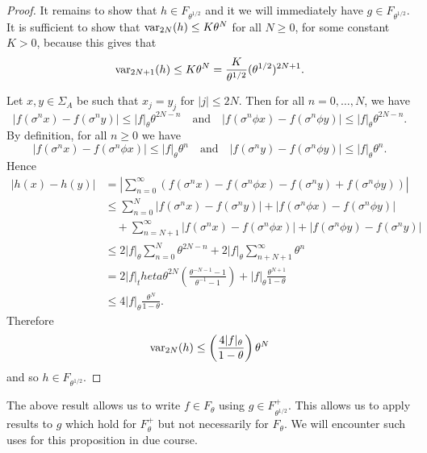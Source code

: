 \begin{proposition}
\begin{proof}
		It remains to show that $h \in F_{\theta^{1 / 2}}$ and it we will immediately have $g \in F_{\theta^{1 / 2}}$. It is sufficient to show that $\operatorname{var}_{2N}(h) \leq K\theta^N$ for all $N \geq 0$, for some constant $K > 0$, because this gives that
		\[
			\operatorname{var}_{2N + 1}(h) \leq K\theta^N = \frac{K}{\theta^{1 / 2}}(\theta^{1 / 2})^{2N + 1}.
		\]
		
		Let $x, y \in \Sigma_A$ be such that $x_j = y_j$ for $|j| \leq 2N$. Then for all $n = 0, \dots, N$, we have
		\[
			|f(\sigma^n{x}) - f(\sigma^n{y})| \leq |f|_\theta \theta^{2N - n} \quad \text{and} \quad |f(\sigma^n \phi{x}) - f(\sigma^n \phi{y})| \leq |f|_\theta \theta^{2N - n}.
		\]
		By definition, for all $n \geq 0$ we have
		\[
			|f(\sigma^n{x}) - f(\sigma^n \phi{x})| \leq |f|_\theta \theta^n \quad \text{and} \quad |f(\sigma^n {y}) - f(\sigma^n \phi{y})| \leq |f|_\theta \theta^n.
		\]
		Hence
		\begin{align*}
			|h(x) - h(y)| &= \left|\sum_{n = 0}^\infty{(f(\sigma^n{x}) - f(\sigma^n \phi{x}) - f(\sigma^n{y}) + f(\sigma^n \phi{y}))}\right| \\
				&\leq \sum_{n = 0}^N{|f(\sigma^n{x}) - f(\sigma^n{y})| + | f(\sigma^n \phi{x}) -  f(\sigma^n \phi{y})|} \\
				&\quad + \sum_{n = N + 1}^\infty{|f(\sigma^n{x}) - f(\sigma^n \phi{x})| + | f(\sigma^n \phi{y}) -  f(\sigma^n {y})|} \\
				&\leq 2|f|_\theta \sum_{n = 0}^N{\theta^{2N - n}} + 2|f|_\theta \sum_{n + N + 1}^\infty{\theta^n} \\
				&= 2|f|_theta \theta^{2N} \left(\frac{\theta^{-N - 1} - 1}{\theta^{-1} - 1}\right) + |f|_\theta \frac{\theta^{N + 1}}{1 - \theta} \\
				&\leq 4|f|_\theta \frac{\theta^N}{1 - \theta}.
		\end{align*}
		Therefore
		\[
			\operatorname{var}_{2N}(h) \leq \left(\frac{4|f|_\theta}{1 - \theta}\right)\theta^N
		\]
		and so $h \in F_{\theta^{1 / 2}}$.
	\end{proof}
\end{proposition}

The above result allows us to write $f \in F_\theta$ using $g \in F_{\theta^{1 / 2}}^+$. This allows us to apply results to $g$ which hold for $F_\theta^+$ but not necessarily for $F_\theta$. We will encounter such uses for this proposition in due course.

